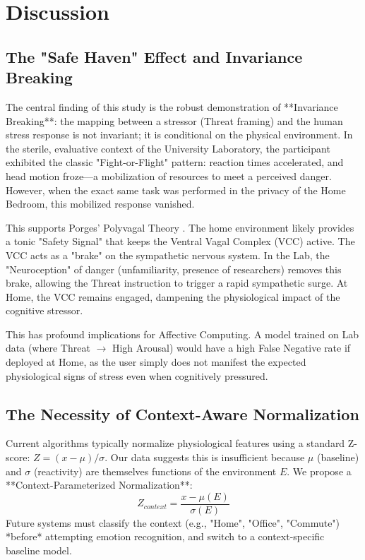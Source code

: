 \documentclass[journal]{IEEEtran}
\begin{document}
\section{Discussion}

\subsection{The "Safe Haven" Effect and Invariance Breaking}
The central finding of this study is the robust demonstration of **Invariance Breaking**: the mapping between a stressor (Threat framing) 
and the human stress response is not invariant; it is conditional on the physical environment.
In the sterile, evaluative context of the University Laboratory, the participant exhibited the classic "Fight-or-Flight" pattern: 
reaction times accelerated, and head motion froze—a mobilization of resources to meet a perceived danger.
However, when the exact same task was performed in the privacy of the Home Bedroom, this mobilized response vanished.

This supports Porges' Polyvagal Theory \cite{polyvagal}. The home environment likely provides a tonic "Safety Signal" that keeps the Ventral Vagal Complex (VCC) active.
The VCC acts as a "brake" on the sympathetic nervous system. In the Lab, the "Neuroception" of danger (unfamiliarity, presence of researchers) 
removes this brake, allowing the Threat instruction to trigger a rapid sympathetic surge. 
At Home, the VCC remains engaged, dampening the physiological impact of the cognitive stressor.

This has profound implications for Affective Computing. A model trained on Lab data (where Threat $\to$ High Arousal) 
would have a high False Negative rate if deployed at Home, as the user simply does not manifest the expected physiological signs of stress 
even when cognitively pressured.

\subsection{The Necessity of Context-Aware Normalization}
Current algorithms typically normalize physiological features using a standard Z-score: $Z = (x - \mu) / \sigma$.
Our data suggests this is insufficient because $\mu$ (baseline) and $\sigma$ (reactivity) are themselves functions of the environment $E$.
We propose a **Context-Parameterized Normalization**:
\begin{equation}
    Z_{context} = \frac{x - \mu(E)}{\sigma(E)}
\end{equation}
Future systems must classify the context (e.g., "Home", "Office", "Commute") *before* attempting emotion recognition, 
and switch to a context-specific baseline model.
\end{document}
